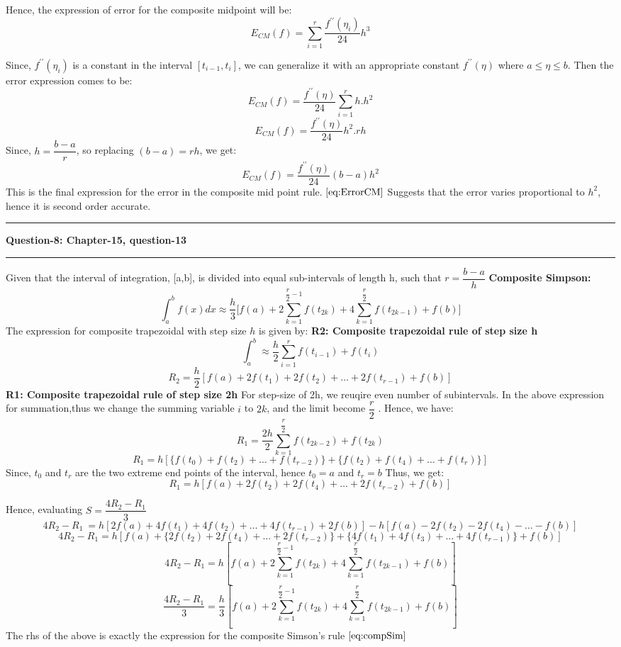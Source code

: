 \documentclass{article}
\newcommand\question[2]{\vspace{.25in}\hrule\textbf{#1: #2}\hrule\vspace{.10in}}
\begin{document}
  Hence, the expression of error for the composite midpoint will be:
  \[E_{CM}(f) = \sum_{i=1}^r \dfrac{f^{\prime\prime}(\eta_i)}{24}h^3\]

  Since, $f^{\prime\prime}(\eta_i)$ is a constant in the interval $[t_{i-1},t_i]$, we can generalize it with an appropriate constant $f^{\prime\prime}(\eta)$ where $a \leq \eta \leq b$. Then the error expression comes to be:
  \[ E_{CM}(f) = \dfrac{f^{\prime\prime}(\eta)}{24} \sum_{i=1}^{r} h.h^2\]
  \[ E_{CM}(f) = \dfrac{f^{\prime\prime}(\eta)}{24} h^2.rh\]
  Since, $h = \dfrac{b-a}{r}$, so replacing $(b-a) = rh$, we get:
  \begin{equation}
   E_{CM}(f) = \dfrac{f^{\prime\prime}(\eta)}{24}(b-a)h^2
   \label{eq:ErrorCM}
  \end{equation}
  This is the final expression for the error in the composite mid point rule. \newline
  $\eqref{eq:ErrorCM}$ Suggests that the error varies proportional to $h^2$, hence it is second order accurate. 


  \question{Question-8}{Chapter-15, question-13}
  Given that the interval of integration, [a,b], is divided into equal sub-intervals of length h, such that $r = \dfrac{b-a}{h}$
  \textbf {Composite Simpson:}\newline
  \begin{equation}
	  \int_{a}^{b} f(x) dx \approx \dfrac{h}{3}\bigg [ f(a) + 2\sum_{k=1}^{\dfrac{r}{2}-1} f(t_{2k}) + 4\sum_{k=1}^{\dfrac{r}{2}}f(t_{2k-1}) + f(b)\bigg ]
	  \label{eq:compSim}
  \end{equation}
  The expression for composite trapezoidal with step size $h$ is given by: \newline
  \textbf {R2: Composite trapezoidal rule of step size h}
  \[ \int_{a}^{b} \approx \dfrac{h}{2} \sum_{i=1}^{r} f(t_{i-1}) + f(t_i)\]
  \[R_2 = \dfrac{h}{2}[ f(a) + 2f(t_1) + 2f(t_2) + \dots + 2f(t_{r-1}) + f(b) ]\]
  \textbf {R1: Composite trapezoidal rule of step size 2h}
  For step-size of 2h, we reuqire even number of subintervals. In the above expression for summation,thus we change the summing variable $i$ to $2k$, and the limit become $\dfrac{r}{2}$ . Hence, we have:
  \[R_1 = \dfrac{2h}{2}\sum_{k=1}^{\dfrac{r}{2}} f(t_{2k-2}) + f(t_{2k})\]
  \[R_1 = h[ \{f(t_0) + f(t_2) + \dots + f(t_{r-2})\} + \{ f(t_2) + f(t_4) + \dots + f(t_r) \} ]\]
  Since, $t_0$ and $t_r$ are the two extreme end points of the interval, hence $t_0 = a$ and $t_r = b$
  Thus, we get:
  \[R_1 = h[f(a) + 2f(t_2) + 2f(t_4) + \dots + 2f(t_{r-2}) + f(b)]\]

  Hence, evaluating $S = \dfrac{4R_2 - R_1}{3}$
  \[4R_2 - R_1\ = h[2f(a) + 4f(t_1) + 4f(t_2)+\dots+4f(t_{r-1}) + 2f(b)] - h[f(a) - 2f(t_2) - 2f(t_4) - \dots-f(b)]\]
  \[4R_2 - R_1 = h[ f(a) + \{2f(t_2) + 2f(t_4) +\dots+2f(t_{r-2})\} + \{ 4f(t_1)+4f(t_3) + \dots+4f(t_{r-1})\} + f(b) ]\]
  \[4R_2 - R_1 = h[ f(a) + 2\sum_{k=1}^{\dfrac{r}{2}-1}f(t_{2k}) + 4\sum_{k=1}^{\dfrac{r}{2}}f(t_{2k-1}) + f(b)]\]
  \[\dfrac{4R_2 - R_1}{3} = \dfrac{h}{3}[ f(a) + 2\sum_{k=1}^{\dfrac{r}{2}-1}f(t_{2k}) + 4\sum_{k=1}^{\dfrac{r}{2}}f(t_{2k-1}) + f(b)]\]
  The rhs of the above is exactly the expression for the composite Simson's rule $\eqref{eq:compSim}$
\end{document}
